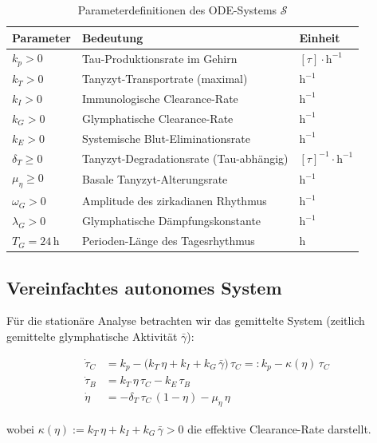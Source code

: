 ﻿\documentclass[12pt,a4paper]{article}
\theoremstyle{definition}
\begin{document}
	\begin{table}[H]
		\centering
		\caption{Parameterdefinitionen des ODE-Systems $\mathcal{S}$}
		\label{tab:parameter}
		\begin{tabular}{lll}
			\toprule
			\textbf{Parameter} & \textbf{Bedeutung} & \textbf{Einheit} \\
			\midrule
			$k_p > 0$ & Tau-Produktionsrate im Gehirn & $[\tau]\cdot\text{h}^{-1}$ \\
			$k_T > 0$ & Tanyzyt-Transportrate (maximal) & $\text{h}^{-1}$ \\
			$k_I > 0$ & Immunologische Clearance-Rate & $\text{h}^{-1}$ \\
			$k_G > 0$ & Glymphatische Clearance-Rate & $\text{h}^{-1}$ \\
			$k_E > 0$ & Systemische Blut-Eliminationsrate & $\text{h}^{-1}$ \\
			$\delta_T \geq 0$ & Tanyzyt-Degradationsrate (Tau-abhängig) & $[\tau]^{-1}\cdot\text{h}^{-1}$ \\
			$\mu_\eta \geq 0$ & Basale Tanyzyt-Alterungsrate & $\text{h}^{-1}$ \\
			$\omega_G > 0$ & Amplitude des zirkadianen Rhythmus & $\text{h}^{-1}$ \\
			$\lambda_G > 0$ & Glymphatische Dämpfungskonstante & $\text{h}^{-1}$ \\
			$T_G = 24\,\text{h}$ & Perioden-Länge des Tagesrhythmus & $\text{h}$ \\
			\bottomrule
		\end{tabular}
	\end{table}
	
	\subsection{Vereinfachtes autonomes System}
	
	Für die stationäre Analyse betrachten wir das gemittelte System (zeitlich gemittelte glymphatische Aktivität $\bar{\gamma}$):
	
	\begin{align}
		\dot{\tau}_C &= k_p - \bigl(k_T\,\eta + k_I + k_G\,\bar{\gamma}\bigr)\,\tau_C =: k_p - \kappa(\eta)\,\tau_C \label{eq:auto1}\\
		\dot{\tau}_B &= k_T\,\eta\,\tau_C - k_E\,\tau_B \label{eq:auto2}\\
		\dot{\eta}   &= -\delta_T\,\tau_C\,(1-\eta) - \mu_\eta\,\eta \label{eq:auto3}
	\end{align}
	
	wobei $\kappa(\eta) := k_T\,\eta + k_I + k_G\,\bar{\gamma} > 0$ die effektive Clearance-Rate darstellt.
	
\end{document}
